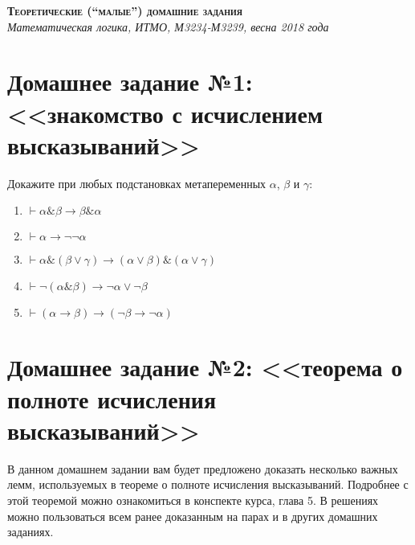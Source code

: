 \documentclass[10pt,a4paper,oneside]{article}
\begin{document}
\begin{center}{\Large\textsc{\textbf{Теоретические (``малые'') домашние задания}}}\\
             \it Математическая логика, ИТМО, М3234-М3239, весна 2018 года\end{center}

\section*{Домашнее задание №1: <<знакомство с исчислением высказываний>>}

Докажите при любых подстановках метапеременных $\alpha$, $\beta$ и $\gamma$:
\begin{enumerate}
\item $\vdash\alpha\&\beta\rightarrow\beta\&\alpha$
\item $\vdash\alpha \rightarrow \neg\neg \alpha$
\item $\vdash\alpha\&(\beta\vee\gamma) \rightarrow (\alpha\vee\beta)\&(\alpha\vee\gamma)$
\item $\vdash\neg(\alpha\&\beta) \rightarrow \neg\alpha\vee\neg\beta$
\item $\vdash(\alpha\rightarrow\beta)\rightarrow(\neg\beta\rightarrow\neg\alpha)$
\end{enumerate}

\section*{Домашнее задание №2: <<теорема о полноте исчисления высказываний>>}

В данном домашнем задании вам будет предложено доказать несколько
важных лемм, используемых в теореме о полноте исчисления
высказываний. Подробнее с этой теоремой можно ознакомиться в конспекте курса,
глава 5. В решениях можно пользоваться всем ранее доказанным
на парах и в других домашних заданиях.
\end{document}
